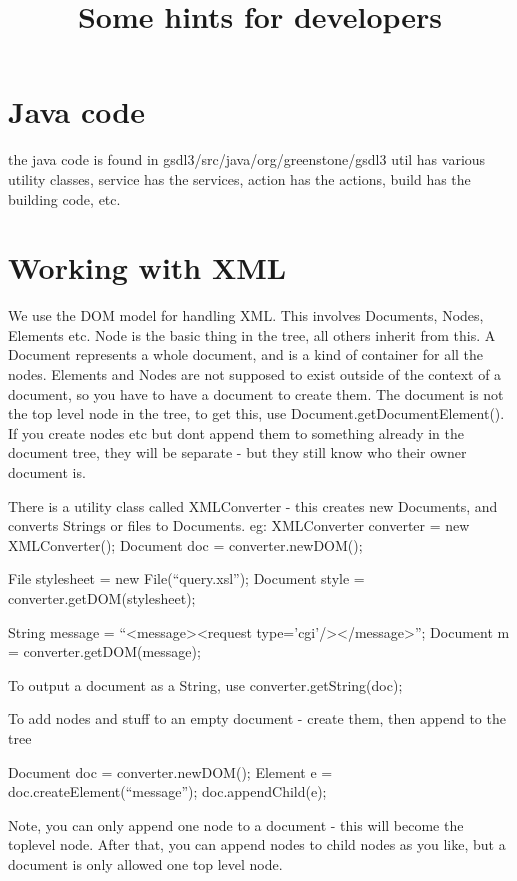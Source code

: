 \documentclass[a4paper,11pt]{article}
\begin{document}
\title{Some hints for developers}

\maketitle

\section{Java code}

the java code is found in gsdl3/src/java/org/greenstone/gsdl3
util has various utility classes, service has the services, action has the actions, build has the building code, etc.

\section{Working with XML}

We use the DOM model for handling XML. This involves Documents, Nodes, Elements etc. Node is the basic thing in the tree, all others inherit from this. A Document represents a whole document, and is a kind of container for all the nodes. Elements and Nodes are not supposed to exist outside of the context of a document, so you have to have a document to create them. The document is not the top level node in the tree, to get this, use Document.getDocumentElement(). If you create nodes etc but dont append them to something already in the document tree, they will be separate - but they still know who their owner document is.

There is a utility class called XMLConverter - this creates new Documents, and converts Strings or files to Documents.
eg:
XMLConverter converter = new XMLConverter();
Document doc = converter.newDOM();

File stylesheet = new File(``query.xsl'');
Document style = converter.getDOM(stylesheet);

String message = ``<message><request type='cgi'/></message>'';
Document m = converter.getDOM(message);

To output a document as a String, use converter.getString(doc);


To add nodes and stuff to an empty document - create them, then append to the tree

Document doc = converter.newDOM();
Element e = doc.createElement(``message'');
doc.appendChild(e);

Note, you can only append one node to a document - this will become the toplevel node. After that, you can append nodes to child nodes as you like, but a document is only allowed one top level node.
\end{document}
